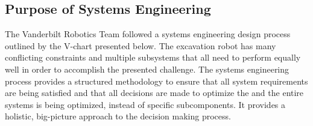 \documentclass[class=article, crop=false]{standalone}
\begin{document}
	\subsection{Purpose of Systems Engineering}
	\label{subsec:systems_engineering_purpose}
	The Vanderbilt Robotics Team followed a systems engineering design process outlined by the V-chart presented below. The excavation robot has many conflicting constraints and multiple subsystems that all need to perform equally well in order to accomplish the presented challenge. The systems engineering process provides a structured methodology to ensure that all system requirements are being satisfied and that all decisions are made to optimize the  and the entire systems is being optimized, instead of specific subcomponents. It provides a holistic, big-picture approach to  the decision making process. 

	
\end{document}
